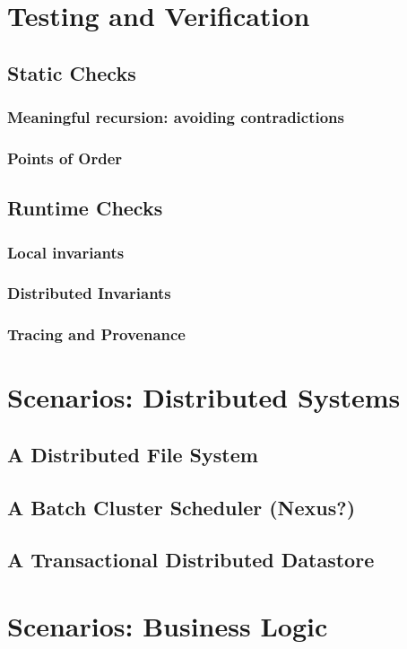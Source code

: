 \documentclass[]{book}
\begin{document}
\chapter{Testing and Verification}
    \section{Static Checks}
        \subsection{Meaningful recursion: avoiding contradictions}
        \subsection{Points of Order}
    \section{Runtime Checks}
        \subsection{Local invariants}
        \subsection{Distributed Invariants}
        \subsection{Tracing and Provenance}
        
\chapter{Scenarios: Distributed Systems}
    \section{A Distributed File System}
    \section{A Batch Cluster Scheduler (Nexus?)}
    \section{A Transactional Distributed Datastore}

\chapter{Scenarios: Business Logic}
\end{document}
